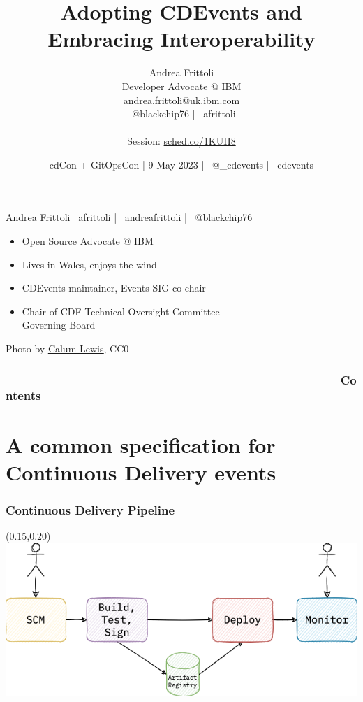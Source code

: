\documentclass[aspectratio=169,11pt,hyperref={colorlinks=true}]{beamer}
\title{Adopting CDEvents and Embracing Interoperability}
\date[9 May 2023]{cdCon + GitOpsCon | 9 May 2023 | \faTwitter ~@\_cdevents | \faGithub ~cdevents}
\author[Andrea Frittoli]{%
  Andrea Frittoli \\
  Developer Advocate @ IBM\\
  andrea.frittoli@uk.ibm.com \\
  \faTwitter ~@blackchip76 | \faGithub ~afrittoli\\
  ~\\
  Session: \href{https://sched.co/1KUH8}{sched.co/1KUH8}
}
\begin{document}
\begin{frame}
\titlepage{}
\end{frame}

\begin{speakerframe}{Andrea Frittoli}%
  {%
  \faGithub ~afrittoli | \faLinkedin ~andreafrittoli | \faTwitter ~@blackchip76
  }%
  {%
  \begin{itemize}
    \item{Open Source Advocate @ IBM}
    \item{Lives in Wales, enjoys the wind}
    \item{CDEvents maintainer, Events SIG co-chair}
    \item{Chair of CDF Technical Oversight Committee \\ Governing Board}
  \end{itemize}
  }%
\end{speakerframe}

\begin{lpicrblack}{%
  Photo by \href{https://unsplash.com/@calumlewis}{\underline{Calum Lewis}}, CC0
  }%
  {%
  \tableofcontents
  }%
  {}
  \frametitle{~~~~~~~~~~~~~~~~~~~~~~~~~~~~~~~~~~~~~~~~~~~~~~~~~~~Contents}
\end{lpicrblack}

\section[CDEvents]{A common specification for Continuous Delivery events}

\begin{grayframe}
  \frametitle{Continuous Delivery Pipeline}
  \begin{textblock*}{0.70\paperwidth}(0.15\paperwidth,0.20\paperheight)
    \includegraphics[width=0.70\paperwidth]{img/cdevents-1-no-events.png}
  \end{textblock*}
\end{grayframe}
\end{document}
